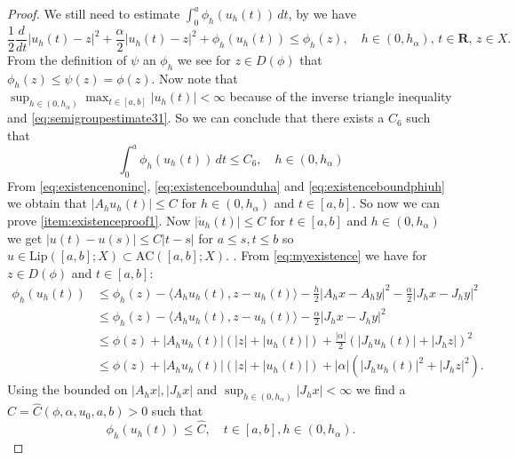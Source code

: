 \documentclass[a4paper,11pt, leqno]{scrreprt} %
\renewcommand{\leq}{\leqslant}
\renewcommand{\leq}{\leqslant}
\newcommand{\R}{\mathbf R}
\theoremstyle{change}
\theoremstyle{nonumberplain}
\newtheorem{proof}{Proof}
\begin{document}
\begin{proof}
  We still need to estimate $\int_0^a \phi_h(u_h(t)) \, dt$, by
   we have
  \begin{equation}
    \label{eq:existencevi}
    \frac12 \frac{d}{dt} |u_h(t) - z|^2 + \frac\alpha2 |u_h(t) - z|^2
    + \phi_h(u_h(t)) \leq \phi_h(z), \quad h \in (0, h_\alpha), \, t
    \in \R, \, z
    \in X.
  \end{equation}
  From the definition of $\psi$ an $\phi_h$ we see for $z \in
  D(\phi)$ that $\phi_h(z) \leq \psi(z) = \phi(z)$. Now note that
  $\sup_{h \in (0, h_\alpha)} \max_{t \in [a,b]} |u_h(t)| < \infty$
  because of the inverse triangle inequality and
  \eqref{eq:semigroupestimate31}.
  So we can conclude that there exists a $C_6$ such that
  \begin{equation}
    \label{eq:existenceboundphiuh}
    \int_0^a \phi_h(u_h(t)) \, dt \leq C_6, \quad h \in (0, h_\alpha)
  \end{equation}
  From \eqref{eq:existencenoninc}, \eqref{eq:existencebounduha} and
  \eqref{eq:existenceboundphiuh} we obtain that $|A_h u_h(t)| \leq C$
  for $h \in (0, h_\alpha)$ and $t \in [a,b]$.
  So now we can prove \ref{item:existenceproof1}. Now $|\dot u_h(t)|
  \leq C$ for $t \in [a,b]$ and $h \in (0, h_\alpha)$ we get $|u(t) -
  u(s)| \leq C|t - s|$ for $a \leq s, t \leq b$ so $u \in
  \text{Lip}([a,b]; X) \subset \text{AC}([a,b]; X)$.
  \label{item:existenceproof2}. From \eqref{eq:myexistence} we have
  for $z \in D(\phi)$ and $t \in [a,b]$:
  \begin{equation*}
    \begin{split}
      \phi_h(u_h(t)) &\leq \phi_h(z) - \langle A_h u_h(t), z - u_h(t)
      \rangle -\frac{h}2 |A_h x - A_h y|^2 - \frac\alpha2 |J_h x - J_h
      y|^2\\
      &\leq \phi_h(z) - \langle A_h u_h(t), z - u_h(t)
      \rangle - \frac\alpha2 |J_h x - J_h
      y|^2\\
      &\leq \phi(z) + |A_h u_h(t)|(|z| + |u_h(t)|) + \frac{|\alpha|}2
      (|J_h u_h(t)| + |J_h z|)^2\\
      &\leq \phi(z) + |A_h u_h(t)|(|z| + |u_h(t)|) + |\alpha|
      (|J_h u_h(t)|^2 + |J_h z|^2).
    \end{split}
  \end{equation*}
  Using the bounded on $|A_h x|, |J_h x|$ and $\sup_{h \in (0,
    h_\alpha)} |J_h x| < \infty$ we find a $\hat C = \hat C(\phi,
    \alpha, u_0, a, b) > 0$ such that
    \begin{equation}
      \label{eq:existenceboundphiuh}
      \phi_h(u_h(t)) \leq \hat C, \quad t \in [a,b], h \in (0, h_\alpha).

\end{equation}
\end{proof}
\end{document}
